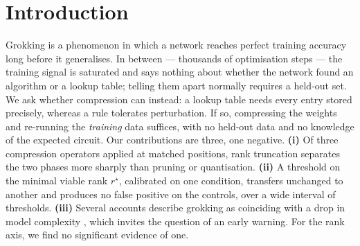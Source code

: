 \documentclass{article}
\begin{document}

\printAffiliationsAndNotice{}

\begin{abstract}
	During grokking a network memorises its training data long before it generalises. In
	between, training accuracy is saturated and cannot tell the two phases apart; we ask
	whether post-training compression can. Applying SVD rank truncation, magnitude pruning and uniform quantisation at matched
	points on the trajectory, rank provides the strongest separation (gap $+0.86$, against $+0.38$
	and $+0.22$). A threshold on the minimal viable rank, calibrated on one condition, transfers unchanged
	to another ($4/4$) with no false positive on four controls, and holds for every threshold
	in $[11,31]$. We find no significant evidence that it arrives before the accuracy jump
	(median $-130$ steps, sign test $p = 0.15$, $n = 12$). Code:
	\url{https://github.com/GiovanniCiarra/DLAI-Project2026}.
\end{abstract}

\section{Introduction}

Grokking \cite{power2022} is a phenomenon in which a network reaches perfect
training accuracy long before it generalises. In between --- thousands of optimisation
steps --- the training signal is saturated and says nothing about whether the network
found an algorithm or a lookup table; telling them apart normally requires a held-out
set. We ask whether compression can instead: a lookup table needs every entry stored
precisely, whereas a rule tolerates perturbation. If so, compressing the weights and
re-running the \emph{training} data suffices, with no held-out data and no knowledge of
the expected circuit.
Our contributions are three, one negative. \textbf{(i)} Of three compression operators applied at matched positions, rank truncation
separates the two phases more sharply than pruning or quantisation. \textbf{(ii)} A threshold on the minimal viable rank $r^\star$, calibrated on one
condition, transfers unchanged to another and produces no false positive on the
controls, over a wide interval of thresholds. \textbf{(iii)} Several accounts describe grokking as coinciding with a drop in model
complexity \cite{liu2023,varma2023}, which invites the question of an
early warning. For the rank axis, we find no significant evidence of one.
\end{document}
